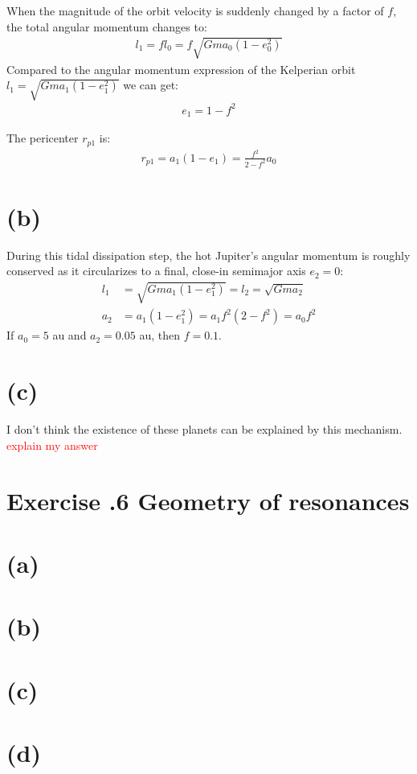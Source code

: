 \documentclass[a4paper,12pt]{article}
\begin{document}
When the magnitude of the orbit velocity is suddenly changed by a factor of $f$, the total angular momentum changes to:
\begin{align*}
    l_1 = fl_0 = f\sqrt{Gma_0(1-e_0^2)}
\end{align*}
Compared to the angular momentum expression of the Kelperian orbit $l_1 = \sqrt{Gma_1(1-e_1^2)}$ we can get:
\begin{align*}
    e_1 = 1 - f^2
\end{align*}

The pericenter $r_{p1}$ is:
\begin{align*}
    r_{p1} = a_1 (1 - e_1) = \frac{f^2}{2 - f^2} a_0
\end{align*}

\section*{(b)}
During this tidal dissipation step, the hot Jupiter's angular momentum is roughly conserved as it circularizes to a final, close-in
semimajor axis $e_2=0$:
\begin{align*}
    l_1 &= \sqrt{Gma_1(1-e_1^2)} = l_2 = \sqrt{Gma_2} \\
    a_2 &= a_1 (1-e_1^2) = a_1 f^2 (2 - f^2) = a_0 f^2
\end{align*}
If $a_0 = 5$ au and $a_2 = 0.05$ au, then $f = 0.1$.

\section*{(c)}
I don't think the existence of these planets can be explained by this mechanism.
\textcolor{red}{explain my answer}


\section*{\textbf{Exercise \uppercase\expandafter{}.6 Geometry of resonances}}
\section*{(a)}
\section*{(b)}
\section*{(c)}
\section*{(d)}
\end{document}
